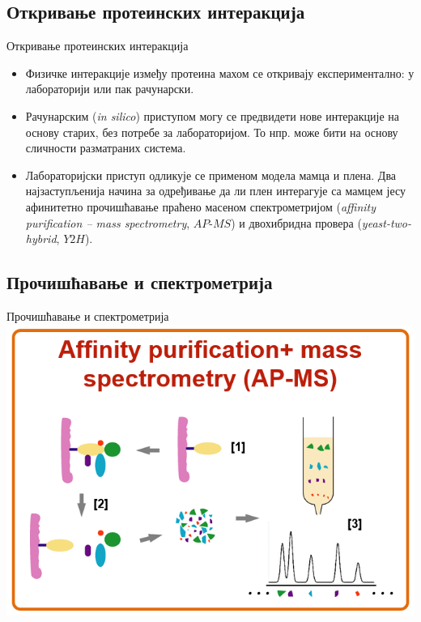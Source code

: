 \documentclass[hyperref={bookmarks=false}]{beamer}
\begin{document}
\subsection{Откривање протеинских интеракција}
\begin{frame}{Откривање протеинских интеракција}
\begin{itemize}
	\item Физичке интеракције између протеина махом се откривају експериментално: у лабораторији или пак рачунарски.

	\item Рачунарским (\textit{in silico}) приступом могу се предвидети нове интеракције на основу старих, без потребе за лабораторијом. То нпр. може бити на основу сличности разматраних система.

	\item Лабораторијски приступ одликује се применом модела мамца и плена. Два најзаступљенија начина за одређивање да ли плен интерагује са мамцем јесу афинитетно прочишћавање праћено масеном спектрометријом (\textit{affinity purification -- mass spectrometry}, $AP$-$MS$) и двохибридна провера (\textit{yeast-two-hybrid}, $Y2H$).
\end{itemize}
\end{frame}

\subsection{Прочишћавање и спектрометрија}
\begin{frame}{Прочишћавање и спектрометрија}
\centering\includegraphics[width=.85\textwidth]{AP-MS.png}
\end{frame}
\end{document}
